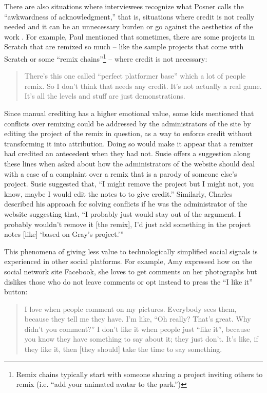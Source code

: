 There are also situations where interviewees recognize what Posner
calls the ``awkwardness of acknowledgment,'' that is, situations where
credit is not really needed and it can be an unnecessary burden or go
against the aesthetics of the work \cite{posner_little_2007}. For
example, Paul mentioned that sometimes, there are some projects in
Scratch that are remixed so much -- like the sample projects that come
with Scratch or some ``remix chains''\footnote{Remix chains typically
  start with someone sharing a project inviting others to remix 
  (i.e. ``add your animated avatar to the park.'')} -- where credit is not
necessary:

\begin{quote}
  There's this one called ``perfect platformer base'' which a lot of
  people remix. So I don't think that needs any credit. It's not
  actually a real game. It's all the levels and stuff are just
  demonstrations.
\end{quote}

Since manual crediting has a higher emotional value, some kids
mentioned that conflicts over remixing could be addressed by the
administrators of the site by editing the project of the remix in
question, as a way to enforce credit without transforming it into
attribution. Doing so would make it appear that a remixer had credited
an antecedent when they had not. Susie offers a suggestion along these
lines when asked about how the administrators of the website should
deal with a case of a complaint over a remix that is a parody of
someone else's project. Susie suggested that, ``I might remove the
project but I might not, you know, maybe I would edit the notes to to
give credit.''  Similarly, Charles described his approach for solving
conflicts if he was the administrator of the website suggesting that,
``I probably just would stay out of the argument.  I probably wouldn't
remove it [the remix], I'd just add something in the project notes
[like] `based on Gray's project.'''

This phenomena of giving less value to technologically simplified
social signals is experienced in other social platforms. For example,
Amy expressed how on the social network site Facebook, she loves to
get comments on her photographs but dislikes those who do not leave
comments or opt instead to press the ``I like it'' button:

\begin{quote}
  I love when people comment on my pictures.  Everybody sees them,
  because they tell me they have.  I'm like, ``Oh really?  That's
  great.  Why didn't you comment?'' I don't like it when people just
  ``like it'', because you know they have something to say about it;
  they just don't.  It's like, if they like it, then [they should]
  take the time to say something.
\end{quote}


